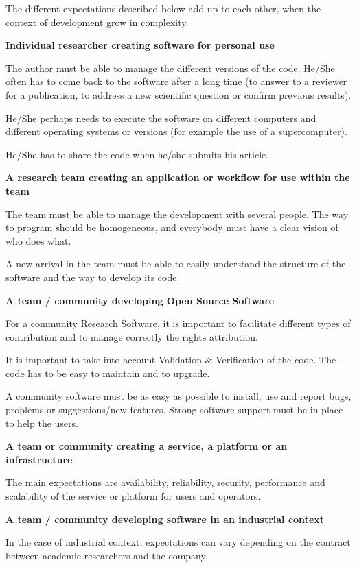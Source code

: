 The different expectations described below add up to each other, when the context of development grow in complexity.

\textbf{Individual researcher creating software for personal use}

The author must be able to manage the different versions of the code. He/She often has to come back to the software after a long time (to answer to a reviewer for a publication, to address a new scientific question or confirm previous results).

He/She perhaps needs to execute the software on different computers and different operating systems or versions (for example the use of a supercomputer).

He/She has to share the code when he/she submits his article.

\textbf{A research team creating an application or workflow for use within the team}

The team must be able to manage the development with several people. The way to program should be homogeneous, and everybody must have a clear vision of who does what.

A new arrival in the team must be able to easily understand the structure of the software and the way to develop its code.

\textbf{A team / community developing Open Source Software}

For a community Research Software, it is important to facilitate different types of contribution and to manage correctly the rights attribution.

It is important to take into account Validation \& Verification of the code. The code has to be easy to maintain and to upgrade.

A community software must be as easy as possible to install, use and report bugs, problems or suggestions/new features. Strong software support must be in place to help the users.

\textbf{A team or community creating a service, a platform or an infrastructure}

The main expectations are availability, reliability, security, performance and scalability of the service or platform for users and operators.

\textbf{A team / community developing software in an industrial context}

In the case of industrial context, expectations can vary depending on the contract between academic researchers and the company.

